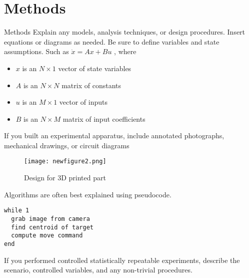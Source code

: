 \documentclass[pdf]{beamer}
\begin{document}
\begin{frame}[fragile]
\begin{columns}
\begin{column}{0.25\textwidth}
\begin{minipage}[t][\textheight]{\linewidth}
\section{Methods}
\begin{block}{Methods}
\small Explain any models, analysis techniques, or design procedures. Insert equations or diagrams as needed.  Be sure to define variables and state assumptions.  Such as $\dot{x} = Ax+Bu$ , where
\begin{itemize}
\item $x$ is an $N \times 1$ vector of state variables
\item $A$ is an $N \times N$ matrix of constants
\item $u$ is an $M \times 1$ vector of inputs
\item $B$ is an $N \times M$ matrix of input coefficients
\end{itemize}
\end{block}
\vfill

\begin{block}{}
\small If you built an experimental apparatus, include annotated photographs,  mechanical drawings, or circuit diagrams
\end{block}
\vfill

\begin{figure}
\texttt{[image: newfigure2.png]}
\caption{Design for 3D printed part}
\end{figure}
\vfill

\begin{block}{}
\small Algorithms are often best explained using pseudocode.
%
\begin{lstlisting}
while 1
  grab image from camera
  find centroid of target
  compute move command
end
\end{lstlisting}
\end{block}
\vfill

\begin{block}{}
\small If you performed controlled statistically repeatable experiments, describe the scenario, controlled variables, and any non-trivial procedures. 
\end{block}
\end{minipage}
\end{column}







\end{columns}
\end{frame}
\end{document}
